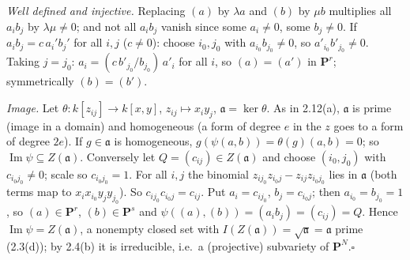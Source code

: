\documentclass[11pt]{article}
\begin{document}
\pf
\emph{Well defined and injective.} Replacing $(a)$ by $\lambda a$ and $(b)$ by $\mu b$ multiplies all $a_ib_j$ by $\lambda\mu\neq0$; and not all $a_ib_j$ vanish since some $a_i\ne0$, some $b_j\ne0$. If $a_ib_j=c\,a_i'b_j'$ for all $i,j$ ($c\ne0$): choose $i_0,j_0$ with $a_{i_0}b_{j_0}\ne0$, so $a'_{i_0}b'_{j_0}\ne0$. Taking $j=j_0$: $a_i=(c\,b'_{j_0}/b_{j_0})\,a'_i$ for all $i$, so $(a)=(a')$ in $\mathbf P^r$; symmetrically $(b)=(b')$.

\emph{Image.} Let $\theta:k[z_{ij}]\to k[x,y]$, $z_{ij}\mapsto x_iy_j$, $\mathfrak a=\ker\theta$. As in 2.12(a), $\mathfrak a$ is prime (image in a domain) and homogeneous (a form of degree $e$ in the $z$ goes to a form of degree $2e$). If $g\in\mathfrak a$ is homogeneous, $g(\psi(a,b))=\theta(g)(a,b)=0$; so $\operatorname{Im}\psi\subseteq Z(\mathfrak a)$. Conversely let $Q=(c_{ij})\in Z(\mathfrak a)$ and choose $(i_0,j_0)$ with $c_{i_0j_0}\ne0$; scale so $c_{i_0j_0}=1$. For all $i,j$ the binomial $z_{ij_0}z_{i_0j}-z_{ij}z_{i_0j_0}$ lies in $\mathfrak a$ (both terms map to $x_ix_{i_0}y_jy_{j_0}$). So $c_{ij_0}c_{i_0j}=c_{ij}$. Put $a_i=c_{ij_0}$, $b_j=c_{i_0j}$; then $a_{i_0}=b_{j_0}=1$, so $(a)\in\mathbf P^r$, $(b)\in\mathbf P^s$ and $\psi((a),(b))=(a_ib_j)=(c_{ij})=Q$. Hence $\operatorname{Im}\psi=Z(\mathfrak a)$, a nonempty closed set with $I(Z(\mathfrak a))=\sqrt{\mathfrak a}=\mathfrak a$ prime (2.3(d)); by 2.4(b) it is irreducible, i.e.\ a (projective) subvariety of $\mathbf P^N$.\hfill$\square$
\end{document}
